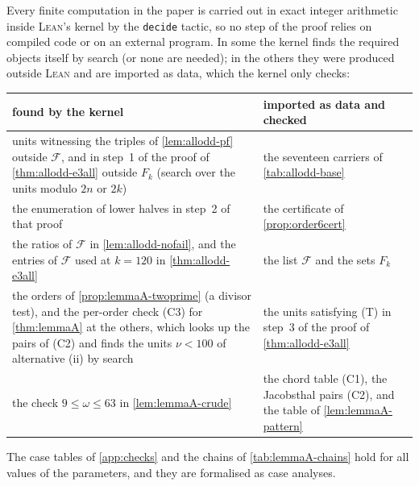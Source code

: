 Every finite computation in the paper is carried out in exact integer
arithmetic inside \textsc{Lean}'s kernel by the \texttt{decide} tactic, so no
step of the proof relies on compiled code or on an external program. In some
the kernel finds the required objects itself by search (or none are needed);
in the others they were produced outside \textsc{Lean} and are imported as
data, which the kernel only checks:
\begin{center}
\small
\begin{tabular}{@{}>{\raggedright\arraybackslash}p{}%
>{\raggedright\arraybackslash}p{}@{}}
found by the kernel & imported as data and checked\\\hline
units witnessing the triples of \autoref{lem:allodd-pf} outside
$\mathcal F$, and in step~1 of the proof of \autoref{thm:allodd-e3all}
outside $F_k$ (search over the units modulo $2n$ or $2k$) &
the seventeen carriers of \autoref{tab:allodd-base}\\
the enumeration of lower halves in step~2 of that proof &
the certificate of \autoref{prop:order6cert}\\
the ratios of $\mathcal F$ in \autoref{lem:allodd-nofail}, and the entries
of $\mathcal F$ used at $k=120$ in \autoref{thm:allodd-e3all} &
the list $\mathcal F$ and the sets $F_k$\\
the orders of \autoref{prop:lemmaA-twoprime} (a divisor test), and the
per-order check (C3) for \autoref{thm:lemmaA} at the others, which looks up the
pairs of (C2) and finds the units $\nu<100$ of alternative (ii) by search &
the units satisfying (T) in step~3 of the proof of
\autoref{thm:allodd-e3all}\\
the check $9\le\omega\le63$ in \autoref{lem:lemmaA-crude} &
the chord table (C1), the Jacobsthal pairs (C2), and the table of
\autoref{lem:lemmaA-pattern}
\end{tabular}
\end{center}
The case tables of \autoref{app:checks} and the chains of
\autoref{tab:lemmaA-chains} hold for all values of the parameters, and they
are formalised as case analyses.
